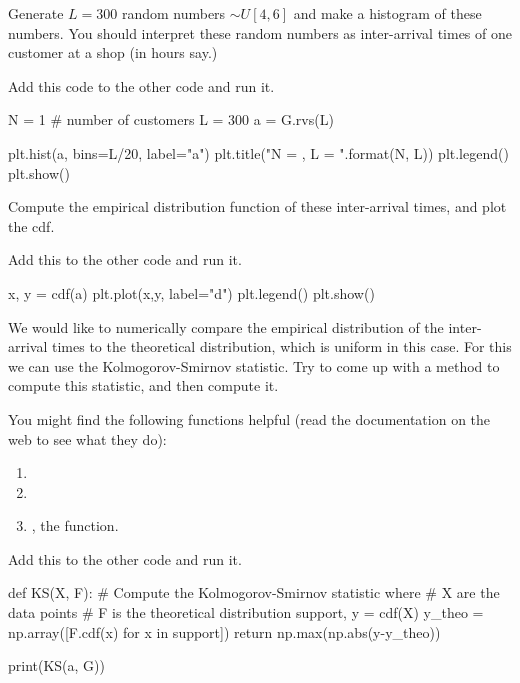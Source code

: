 \begin{exercise}
Generate $L=300$ random numbers $\sim U[4,6]$ and make a histogram of these numbers. You should interpret these random numbers as inter-arrival times of one customer at a shop (in hours say.)
\begin{solution}
Add this code to the other code and run it.
\begin{pyverbatim}
N = 1 # number of customers
L = 300
a = G.rvs(L)

plt.hist(a, bins=L/20, label="a")
plt.title("N = {}, L = {}".format(N, L))
plt.legend()
plt.show()
\end{pyverbatim}
\end{solution}
\end{exercise}

\begin{exercise}
Compute  the empirical distribution function of these inter-arrival times, and plot the cdf.
\begin{solution}
Add this to the other code and run it.
\begin{pyverbatim}
x, y = cdf(a)
plt.plot(x,y,  label="d")
plt.legend()
plt.show()
\end{pyverbatim}
\end{solution}
\end{exercise}

\begin{exercise}
We would like to numerically compare the empirical distribution of the inter-arrival times to the theoretical distribution, which is uniform in this case. 
For this we can use the Kolmogorov-Smirnov statistic. Try to come up with a method to compute this statistic, and then compute it. 

You might find the following functions helpful (read the documentation on the web to see what they do):
\begin{enumerate}
\item {}
\item {}
\item {}, the  function.
\end{enumerate}

\begin{solution}
Add this to the other code and run it.
\begin{pyverbatim}
def KS(X, F):
    # Compute the Kolmogorov-Smirnov statistic where
    # X are the data points
    # F is the theoretical distribution
    support, y = cdf(X)
    y_theo = np.array([F.cdf(x) for x in support])
    return np.max(np.abs(y-y_theo))

print(KS(a, G))    
\end{pyverbatim}
\end{solution}
\end{exercise}

